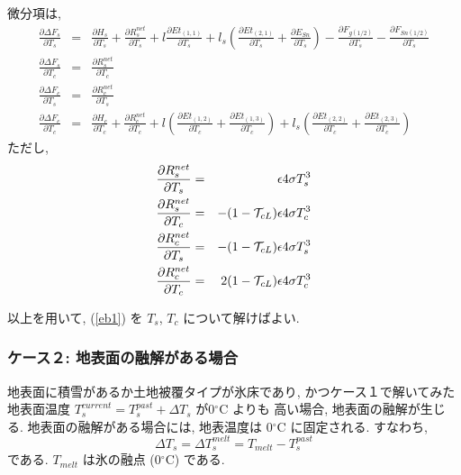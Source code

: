 微分項は,
\begin{eqnarray}
 \frac{\partial \Delta F_s}{\partial T_s} &=&
 \frac{\partial H_s}{\partial T_s}
+\frac{\partial R^{net}_s}{\partial T_s}
+l\frac{\partial Et_{(1,1)}}{\partial T_s}
+l_s\left(\frac{\partial Et_{(2,1)}}{\partial T_s}
+    \frac{\partial E_{Sn}}{\partial T_s}\right)
-\frac{\partial F_{g(1/2)}}{\partial T_s}
-\frac{\partial F_{Sn(1/2)}}{\partial T_s} \\
 \frac{\partial \Delta F_s}{\partial T_c} &=&
 \frac{\partial R^{net}_s}{\partial T_c} \\
 \frac{\partial \Delta F_c}{\partial T_s} &=&
 \frac{\partial R^{net}_c}{\partial T_s} \\
 \frac{\partial \Delta F_c}{\partial T_c} &=&
 \frac{\partial H_c}{\partial T_c}
+\frac{\partial R^{net}_c}{\partial T_c}
+l  \left(\frac{\partial Et_{(1,2)}}{\partial T_c}
+         \frac{\partial Et_{(1,3)}}{\partial T_c}\right)
+l_s\left(\frac{\partial Et_{(2,2)}}{\partial T_c}
+         \frac{\partial Et_{(2,3)}}{\partial T_c}\right)
\end{eqnarray}
ただし,
\begin{eqnarray}
 \frac{\partial R^{net}_s}{\partial T_s} &=&
 \epsilon 4 \sigma T_s^3 \\
 \frac{\partial R^{net}_s}{\partial T_c} &=&
 - ( 1 - {\cal{T}}_{cL} ) \epsilon 4 \sigma T_c^3 \\
 \frac{\partial R^{net}_c}{\partial T_s} &=&
 - ( 1 - {\cal{T}}_{cL} ) \epsilon 4 \sigma T_s^3 \\
 \frac{\partial R^{net}_c}{\partial T_c} &=&
  2( 1 - {\cal{T}}_{cL} ) \epsilon 4 \sigma T_c^3
\end{eqnarray}

以上を用いて, (\ref{eb1}) を $T_s$, $T_c$ について解けばよい.

\subsubsection{ケース２: 地表面の融解がある場合}

地表面に積雪があるか土地被覆タイプが氷床であり, かつケース１で解いてみた
地表面温度 $T_s^{current} = T_s^{past}+\Delta T_s$ が0$^{\circ}$C よりも
高い場合, 地表面の融解が生じる.
地表面の融解がある場合には, 地表温度は 0$^{\circ}$C に固定される.
すなわち,
\begin{equation}
 \Delta T_s = \Delta T_s^{melt} = T_{melt} - T_s^{past}
\end{equation}
である. $T_{melt}$ は氷の融点 (0$^{\circ}$C) である.

